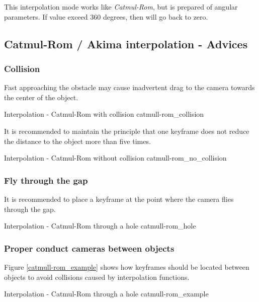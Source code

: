 This interpolation mode works like \emph{Catmul-Rom}, but is prepared of angular
parameters. If value exceed 360 degrees, then will go back to zero.

\subsection{Catmul-Rom / Akima interpolation -
	Advices}\label{catmul-rom-akima-interpolation---advices}

\subsubsection{Collision}\label{collision}

Fast approaching the obstacle may cause inadvertent drag to the camera towards
the center of the object. 

{Interpolation - Catmul-Rom with collision}
{catmull-rom_collision}

It is recommended to maintain the principle that one
keyframe does not reduce the distance to the object more than five times.

{Interpolation - Catmul-Rom without collision}
{catmull-rom_no_collision}

\subsubsection{Fly through the gap}\label{fly-through-the-gap}

It is recommended to place a keyframe at the point where the camera flies
through the gap.

{Interpolation - Catmul-Rom through a hole}
{catmull-rom_hole}

\subsubsection{Proper conduct cameras between
	objects}\label{proper-conduct-cameras-between-objects}

Figure \ref{catmull-rom_example} shows how keyframes should be located between objects to avoid collisions caused by interpolation functions.

{Interpolation - Catmul-Rom through a hole}
{catmull-rom_example}

